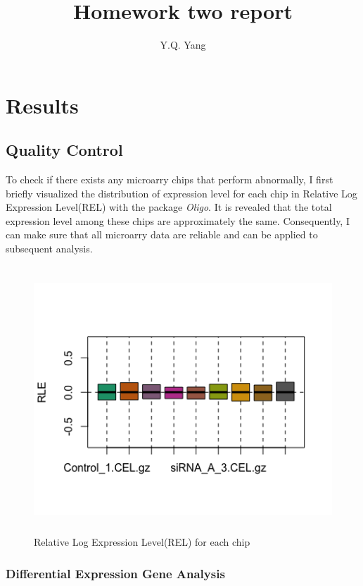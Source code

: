 \documentclass[fleqn,10pt]{wlscirep}
\title{Homework two report}
\author[1,*]{Y.Q. Yang}
\begin{document}
\flushbottom
\maketitle

\thispagestyle{empty}

\section*{Results}

\subsection*{Quality Control}

To check if there exists any microarry chips that perform abnormally, I first briefly visualized the distribution of expression level for each chip in Relative Log Expression Level(REL) with the package \textit{Oligo}. \cite{csdn.net} It is revealed that the total expression level among these chips are approximately the same.  Consequently, I can make sure that all microarry data are reliable and can be applied to subsequent analysis.

\begin{figure}[ht]
    \centering
    \includegraphics[width=15cm,height=10cm]{RLE.png}
    \caption{Relative Log Expression Level(REL) for each chip}
    \label{fig:stream}
    \end{figure}

\subsubsection*{Differential Expression Gene Analysis}
\end{document}
